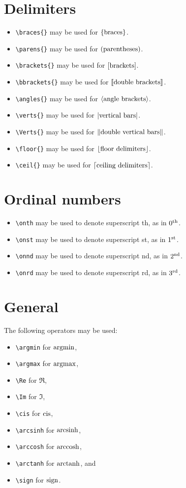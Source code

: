 \documentclass{mszreport}
\begin{document}
\section{Delimiters}

\begin{itemize}
    \item \verb|\braces{}| may be used for $\lbrace\text{braces}\rbrace$.
    \item \verb|\parens{}| may be used for $\lparen\text{parentheses}\rparen$.
    \item \verb|\brackets{}| may be used for $\lbrack\text{brackets}\rbrack$.
    \item \verb|\bbrackets{}| may be used for $\llbracket\text{double brackets}\rrbracket$.
    \item \verb|\angles{}| may be used for $\langle\text{angle brackets}\rangle$.
    \item \verb|\verts{}| may be used for $\lvert\text{vertical bars}\rvert$.
    \item \verb|\Verts{}| may be used for $\lVert\text{double vertical bars}\rVert$.
    \item \verb|\floor{}| may be used for $\lfloor\text{floor delimiters}\rfloor$.
    \item \verb|\ceil{}| may be used for $\lceil\text{ceiling delimiters}\rceil$.
\end{itemize}

\section{Ordinal numbers}

\begin{itemize}
    \item \verb|\onth| may be used to denote superscript th, as in $0^{\text{th}}$.
    \item \verb|\onst| may be used to denote superscript st, as in $1^{\text{st}}$.
    \item \verb|\onnd| may be used to denote superscript nd, as in $2^{\text{nd}}$.
    \item \verb|\onrd| may be used to denote superscript rd, as in $3^{\text{rd}}$.
\end{itemize}

\section{General}

The following operators may be used:
\begin{itemize}
    \item \verb|\argmin| for $\operatorname*{argmin}$,
    \item \verb|\argmax| for $\operatorname*{argmax}$,
    \item \verb|\Re| for $\Re$,
    \item \verb|\Im| for $\Im$,
    \item \verb|\cis| for $\operatorname{cis}$,
    \item \verb|\arcsinh| for $\operatorname{arcsinh}$,
    \item \verb|\arccosh| for $\operatorname{arccosh}$,
    \item \verb|\arctanh| for $\operatorname{arctanh}$, and
    \item \verb|\sign| for $\operatorname{sign}$.
\end{itemize}
\end{document}
